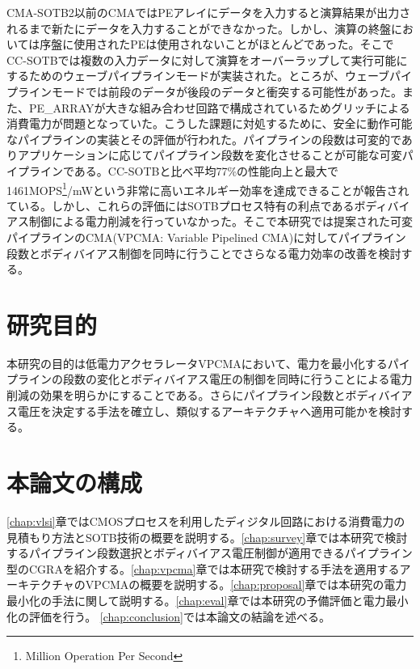 {CMA-SOTB2以前のCMAではPEアレイにデータを入力すると演算結果が出力されるまで新たにデータを入力することができなかった。しかし、演算の終盤においては序盤に使用されたPEは使用されないことがほとんどであった。そこでCC-SOTBでは複数の入力データに対して演算をオーバーラップして実行可能にするためのウェーブパイプラインモードが実装された。ところが、ウェーブパイプラインモードでは前段のデータが後段のデータと衝突する可能性があった。また、PE\_ARRAYが大きな組み合わせ回路で構成されているためグリッチによる消費電力が問題となっていた。こうした課題に対処するために、安全に動作可能なパイプラインの実装とその評価が行われた。パイプラインの段数は可変的でありアプリケーションに応じてパイプライン段数を変化させることが可能な可変パイプラインである。CC-SOTBと比べ平均77\%の性能向上と最大で1461MOPS\footnote{Million Operation Per Second}/mWという非常に高いエネルギー効率を達成できることが報告されている。\cite{vpcma}しかし、これらの評価にはSOTBプロセス特有の利点であるボディバイアス制御による電力削減を行っていなかった。そこで本研究では提案された可変パイプラインのCMA(VPCMA: Variable Pipelined CMA)に対してパイプライン段数とボディバイアス制御を同時に行うことでさらなる電力効率の改善を検討する。

\section{研究目的}
\label{sec:purpose}

本研究の目的は低電力アクセラレータVPCMAにおいて、電力を最小化するパイプラインの段数の変化とボディバイアス電圧の制御を同時に行うことによる電力削減の効果を明らかにすることである。さらにパイプライン段数とボディバイアス電圧を決定する手法を確立し、類似するアーキテクチャへ適用可能かを検討する。

\section{本論文の構成}
\label{sed:composition}
\ref{chap:vlsi}章ではCMOSプロセスを利用したディジタル回路における消費電力の見積もり方法とSOTB技術の概要を説明する。\ref{chap:survey}章では本研究で検討するパイプライン段数選択とボディバイアス電圧制御が適用できるパイプライン型のCGRAを紹介する。\ref{chap:vpcma}章では本研究で検討する手法を適用するアーキテクチャのVPCMAの概要を説明する。\ref{chap:proposal}章では本研究の電力最小化の手法に関して説明する。\ref{chap:eval}章では本研究の予備評価と電力最小化の評価を行う。 \ref{chap:conclusion}では本論文の結論を述べる。


}

